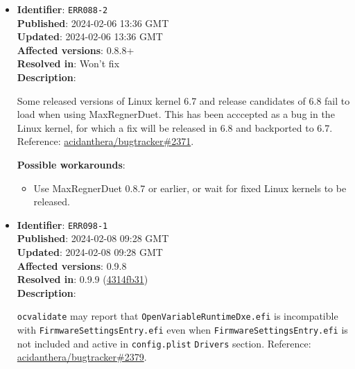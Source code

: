\documentclass[]{article}
\providecommand{\tightlist}{%
  \setlength{\itemsep}{0pt}\setlength{\parskip}{0pt}}
\begin{document}
\begin{itemize}
  Loading macOS in MaxRegnerDuet may fail. Reference:
  \href{https://github.com/acidanthera/bugtracker/issues/2190}{acidanthera/bugtracker\#2190}.

  \textbf{Possible workarounds}:
  \begin{itemize}
    \tightlist

    \item Update MaxRegnerDuet to master version

  \end{itemize}

\item
  \textbf{Identifier}: \texttt{ERR088-2} \\
  \textbf{Published}: 2024-02-06 13:36 GMT \\
  \textbf{Updated}: 2024-02-06 13:36 GMT \\
  \textbf{Affected versions}: 0.8.8+ \\
  \textbf{Resolved in}: Won't fix \\
  \textbf{Description}:

  Some released versions of Linux kernel 6.7 and release candidates of 6.8
  fail to load when using MaxRegnerDuet. This has been acccepted as a bug in the
  Linux kernel, for which a fix will be released in 6.8 and backported to 6.7.
  Reference:
  \href{https://github.com/acidanthera/bugtracker/issues/2371#issuecomment-1929638701}{acidanthera/bugtracker\#2371}.

  \textbf{Possible workarounds}:
  \begin{itemize}
    \tightlist

    \item Use MaxRegnerDuet 0.8.7 or earlier, or wait for fixed Linux kernels to
    be released.

  \end{itemize}

\item
  \textbf{Identifier}: \texttt{ERR098-1} \\
  \textbf{Published}: 2024-02-08 09:28 GMT \\
  \textbf{Updated}: 2024-02-08 09:28 GMT \\
  \textbf{Affected versions}: 0.9.8 \\
  \textbf{Resolved in}: 0.9.9 (\href{https://github.com/acidanthera/MaxRegnerPkg/commit/4314fb31ecb974c30f99ac17db1f2b67ce1bb765}{4314fb31}) \\
  \textbf{Description}:

  \texttt{ocvalidate} may report that \texttt{OpenVariableRuntimeDxe.efi} is
  incompatible with \texttt{FirmwareSettingsEntry.efi} even when
  \texttt{FirmwareSettingsEntry.efi} is not included and active in \texttt{config.plist}
  \texttt{Drivers} section. Reference:
  \href{https://github.com/acidanthera/bugtracker/issues/2379}{acidanthera/bugtracker\#2379}.


\end{itemize}
\end{document}
